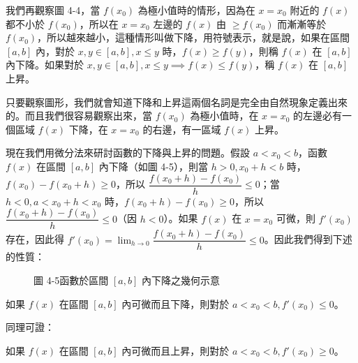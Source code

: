 我們再觀察圖 4-4，當 $f(x_0)$ 為極小值時的情形，因為在 $x=x_0$ 附近的 $f(x)$ 都不小於 $f(x_0)$，所以在 $x=x_0$ 左邊的 $f(x)$ 由 $\ge f(x_0)$ 而漸漸等於 $f(x_0)$，所以越來越小，這種情形叫做下降，用符號表示，就是說，如果在區間 $[a, b]$ 內，對於 $x, y\in[a, b], x\le y$ 時，$f(x)\ge f(y)$，則稱 $f(x)$ 在 $[a, b]$ 內下降。如果對於 $x, y\in[a, b], x\le y \implies f(x)\le f(y)$，稱 $f(x)$ 在 $[a, b]$ 上昇。

只要觀察圖形，我們就會知道下降和上昇這兩個名詞是完全由自然現象定義出來的。而且我們很容易觀察出來，當 $f(x_0)$ 為極小值時，在 $x=x_0$ 的左邊必有一個區域 $f(x)$ 下降，在 $x=x_0$ 的右邊，有一區域 $f(x)$ 上昇。

現在我們用微分法來研討函數的下降與上昇的問題。假設 $a<x_0<b$，函數 $f(x)$ 在區間 $[a, b]$ 內下降（如圖 4-5），則當 $h>0, x_0+h<b$ 時，$f(x_0)-f(x_0+h) \ge 0$，所以 $\dfrac{f(x_0+h)-f(x_0)}{h} \le 0$；當 $h<0, a<x_0+h<x_0$ 時，$f(x_0+h)-f(x_0) \ge 0$，所以 $\dfrac{f(x_0+h)-f(x_0)}{h} \le 0$（因 $h<0$）。如果 $f(x)$ 在 $x=x_0$ 可微，則 $f'(x_0)$ 存在，因此得 $f'(x_0) = \lim_{h\to 0}\dfrac{f(x_0+h)-f(x_0)}{h} \le 0$。因此我們得到下述的性質：

\begin{figure}[H]
\centering
{}
\caption{圖 4-5\quad 函數於區間 $[a, b]$ 內下降之幾何示意}
\label{fig:b6-app4-decreasing}
\end{figure}

\begin{theorem}\label{thm:b6-app4-monotonicity}
如果 $f(x)$ 在區間 $[a, b]$ 內可微而且下降，則對於 $a<x_0<b, f'(x_0) \le 0$。
\end{theorem}

同理可證：

\begin{theorem}\label{thm:b6-app4-monotonicity-inc}
如果 $f(x)$ 在區間 $[a, b]$ 內可微而且上昇，則對於 $a<x_0<b, f'(x_0) \ge 0$。
\end{theorem}

